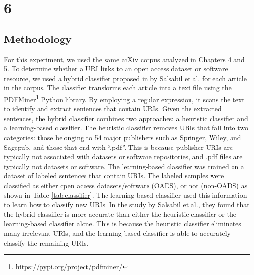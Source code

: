 \chapter{6}
\label{ch:6}


\section{Methodology}

For this experiment, we used the same arXiv corpus analyzed in Chapters 4 and 5. To determine whether a URI links to an open access dataset or software resource, we used a hybrid classifier proposed in by Salsabil et al. \cite{salsabil2022study} for each article in the corpus. The classifier transforms each article into a text file using the PDFMiner\footnote{https://pypi.org/project/pdfminer/} Python library. By employing a regular expression, it scans the text to identify and extract sentences that contain URIs. Given the extracted sentences, the hybrid classifier combines two approaches: a heuristic classifier and a learning-based classifier. The heuristic classifier removes URIs that fall into two categories: those belonging to 54 major publishers such as Springer, Wiley, and Sagepub, and those that end with ``.pdf''. This is because publisher URIs are typically not associated with datasets or software repositories, and .pdf files are typically not datasets or software. The learning-based classifier was trained on a dataset of labeled sentences that contain URIs. The labeled samples were classified as either open access datasets/software (OADS), or not (non-OADS) as shown in Table \ref{tab:classifier}. The learning-based classifier used this information to learn how to classify new URIs. In the study by Salsabil et al., they found that the hybrid classifier is more accurate than either the heuristic classifier or the learning-based classifier alone. This is because the heuristic classifier eliminates many irrelevant URIs, and the learning-based classifier is able to accurately classify the remaining URIs.

